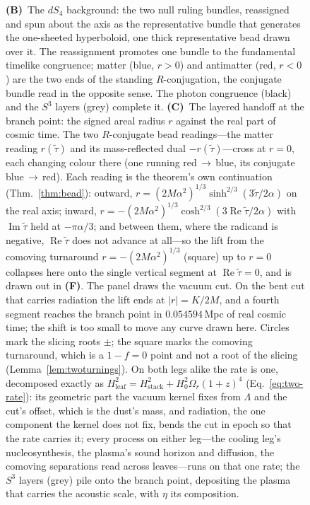 \documentclass[11pt,a4paper]{article}
\theoremstyle{plain}
\theoremstyle{definition}
\theoremstyle{remark}
\begin{document}
\begin{figure}[htbp]
{\textbf{(B)}~The $dS_4$ background: the two null ruling bundles, reassigned and spun about the axis as the representative bundle that generates the one-sheeted hyperboloid, one thick representative bead drawn over it. The reassignment promotes one bundle to the fundamental timelike congruence; matter (blue, $r>0$) and antimatter (red, $r<0$) are the two ends of the standing $R$-conjugation, the conjugate bundle read in the opposite sense. The photon congruence (black) and the $S^3$ layers (grey) complete it.
\textbf{(C)}~The layered handoff at the branch point: the signed areal radius $r$ against the real part of cosmic time. The two $R$-conjugate bead readings---the matter reading $r(\tilde\tau)$ and its mass-reflected dual $-r(\tilde\tau)$---cross at $r=0$, each changing colour there (one running red\,$\to$\,blue, its conjugate blue\,$\to$\,red). Each reading is the theorem's own continuation (Thm.~\ref{thm:bead}): outward, $r=(2M\alpha^2)^{1/3}\sinh^{2/3}(3\tilde\tau/2\alpha)$ on the real axis; inward, $r=-(2M\alpha^2)^{1/3}\cosh^{2/3}(3\operatorname{Re}\tilde\tau/2\alpha)$ with $\operatorname{Im}\tilde\tau$ held at $-\pi\alpha/3$; and between them, where the radicand is negative, $\operatorname{Re}\tilde\tau$ does not advance at all---so the lift from the comoving turnaround $r=-(2M\alpha^2)^{1/3}$ (square) up to $r=0$ collapses here onto the single vertical segment at $\operatorname{Re}\tilde\tau=0$, and is drawn out in \textbf{(F)}. The panel draws the vacuum cut. On the bent cut that carries radiation the lift ends at $|r|=K/2M$, and a fourth segment reaches the branch point in $0.054594$\,Mpc of real cosmic time; the shift is too small to move any curve drawn here. Circles mark the slicing roots $\pm$; the square marks the comoving turnaround, which is a $1-f=0$ point and not a root of the slicing (Lemma~\ref{lem:twoturnings}). On both legs alike the rate is one, decomposed exactly as $H_{\text{leaf}}^{2}=H_{\text{stack}}^{2}+H_0^{2}\Omega_r(1+z)^{4}$ (Eq.~\ref{eq:two-rate}): its geometric part the vacuum kernel fixes from $\Lambda$ and the cut's offset, which is the dust's mass, and radiation, the one component the kernel does not fix, bends the cut in epoch so that the rate carries it; every process on either leg---the cooling leg's nucleosynthesis, the plasma's sound horizon and diffusion, the comoving separations read across leaves---runs on that one rate; the $S^3$ layers (grey) pile onto the branch point, depositing the plasma that carries the acoustic scale, with $\eta$ its composition.
}
\end{figure}
\end{document}
